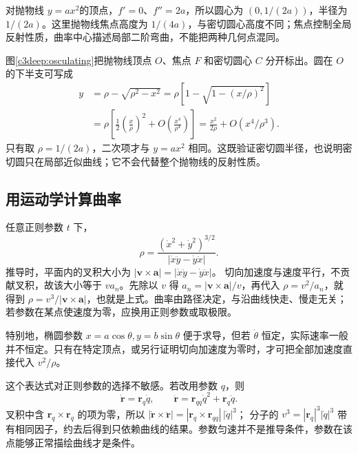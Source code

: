 对抛物线 $y=ax^2$的顶点，$f'=0$、$f''=2a$，所以圆心为 $(0,1/(2a))$，半径为 $1/(2a)$。这里抛物线焦点高度为 $1/(4a)$，与密切圆心高度不同；焦点控制全局反射性质，曲率中心描述局部二阶弯曲，不能把两种几何点混同。



图\ref{c3deep:osculating}把抛物线顶点 $O$、焦点 $F$ 和密切圆心 $C$ 分开标出。圆在 $O$ 的下半支可写成
\[
 \begin{aligned}
 y&=\rho-\sqrt{\rho^2-x^2}
=\rho\left[1-\sqrt{1-(x/\rho)^2}\right]\\
 &=\rho\left[\frac12\left(\frac x\rho\right)^2
       +O\!\left(\frac{x^4}{\rho^4}\right)\right]
=\frac{x^2}{2\rho}+O(x^4/\rho^3).
 \end{aligned}
\]
只有取 $\rho=1/(2a)$，二次项才与 $y=ax^2$ 相同。这既验证密切圆半径，也说明密切圆只在局部近似曲线；它不会代替整个抛物线的反射性质。


\subsection{用运动学计算曲率}
任意正则参数 $t$ 下，
\[
 \rho=\frac{(\dot x^2+\dot y^2)^{3/2}}
 {|\dot x\ddot y-\dot y\ddot x|}.
\]
推导时，平面内的叉积大小为
$|\bm v\times\bm a|=|\dot x\ddot y-\dot y\ddot x|$。
切向加速度与速度平行，不贡献叉积，故该大小等于 $v a_n$。先除以 $v$ 得 $a_n=|\bm v\times\bm a|/v$，再代入 $\rho=v^2/a_n$，就得到 $\rho=v^3/|\bm v\times\bm a|$，也就是上式。曲率由路径决定，与沿曲线快走、慢走无关；若参数在某点使速度为零，应换用正则参数或取极限。

特别地，椭圆参数 $x=a\cos\theta,y=b\sin\theta$ 便于求导，但若 $\dot\theta$ 恒定，实际速率一般并不恒定。只有在特定顶点，或另行证明切向加速度为零时，才可把全部加速度直接代入 $v^2/\rho$。

这个表达式对正则参数的选择不敏感。若改用参数 $q$，则
\[
 \dot{\bm r}=\bm r_q\dot q,\qquad
 \ddot{\bm r}=\bm r_{qq}\dot q^2+\bm r_q\ddot q.
\]
叉积中含 $\bm r_q\times\bm r_q$ 的项为零，所以
$|\dot{\bm r}\times\ddot{\bm r}|=|\bm r_q\times\bm r_{qq}|\,|\dot q|^3$；
分子的 $v^3=|\bm r_q|^3|\dot q|^3$ 带有相同因子，约去后得到只依赖曲线的结果。参数匀速并不是推导条件，参数在该点能够正常描绘曲线才是条件。

